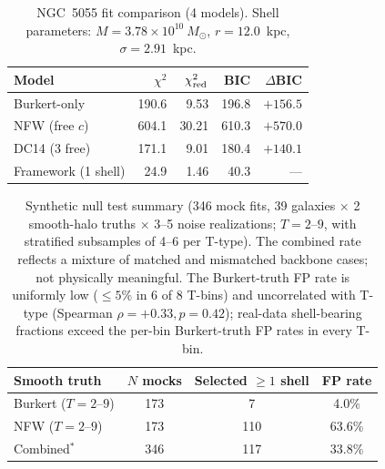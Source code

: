 \documentclass[linenumbers]{aastex701}
\newcommand{\Msun}{M_\odot}
\newcommand{\chired}{\chi^2_{\rm red}}
\begin{document}
\begin{table}
\centering
\small
\caption{NGC~5055 fit comparison (4 models). Shell parameters: $M = 3.78 \times 10^{10}~\Msun$, $r = 12.0$~kpc, $\sigma = 2.91$~kpc.}\label{tab:ngc5055}
\begin{tabular}{l r r r r}
\hline\hline
Model                  & $\chi^2$ & $\chired$ & BIC   & $\Delta$BIC \\
\hline
Burkert-only           & 190.6 & 9.53  & 196.8 & $+156.5$ \\
NFW (free $c$)         & 604.1 & 30.21 & 610.3 & $+570.0$ \\
DC14 (3 free)          & 171.1 & 9.01  & 180.4 & $+140.1$ \\
Framework (1 shell)    & 24.9  & 1.46  & 40.3  & ---      \\
\hline
\end{tabular}
\end{table}

\begin{table}
\centering
\small
\caption{Synthetic null test summary (346 mock fits, 39 galaxies $\times$ 2 smooth-halo truths $\times$ 3--5 noise realizations; $T=2$--$9$, with stratified subsamples of 4--6 per T-type). The combined rate reflects a mixture of matched and mismatched backbone cases; not physically meaningful. The Burkert-truth FP rate is uniformly low ($\le 5\%$ in 6 of 8 T-bins) and uncorrelated with T-type (Spearman $\rho = +0.33, p = 0.42$); real-data shell-bearing fractions exceed the per-bin Burkert-truth FP rates in every T-bin.}\label{tab:nulltest}
\begin{tabular}{l c c c}
\hline\hline
Smooth truth        & $N$ mocks & Selected $\ge 1$ shell & FP rate \\
\hline
Burkert ($T=2$--$9$) & 173 & 7   & 4.0\%  \\
NFW ($T=2$--$9$)     & 173 & 110 & 63.6\% \\
Combined$^*$         & 346 & 117 & 33.8\% \\
\hline
\end{tabular}
\end{table}
\end{document}
